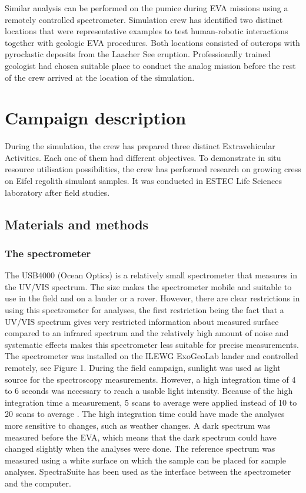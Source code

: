 \documentclass[preprint]{elsarticle}
\begin{document}
Similar analysis can be performed on the pumice during EVA missions using a remotely controlled spectrometer. Simulation crew has identified two distinct locations that were representative examples to test human-robotic interactions together with geologic EVA procedures. Both locations consisted of outcrops with pyroclastic deposits from the Laacher See eruption. Professionally trained geologist had chosen suitable place to conduct the analog mission before the rest of the crew arrived at the location of the simulation.

\section{Campaign description}
During the simulation, the crew has prepared three distinct Extravehicular Activities. Each one of them had different objectives. To demonstrate in situ resource utilisation possibilities, the crew has performed research on growing cress on Eifel regolith simulant samples. It was conducted in ESTEC Life Sciences laboratory after field studies.

\subsection{Materials and methods}

\subsubsection{The spectrometer}
The USB4000 (Ocean Optics) is a relatively small spectrometer that measures in the UV/VIS spectrum. The size makes the spectrometer mobile and suitable to use in the field and on a lander or a rover. However, there are clear restrictions in using this spectrometer for analyses, the first restriction being the fact that a UV/VIS spectrum gives very restricted information about measured surface compared to an infrared spectrum and the relatively high amount of noise and systematic effects makes this spectrometer less suitable for precise measurements. The spectrometer was installed on the ILEWG ExoGeoLab lander and controlled remotely, see Figure 1. During the field campaign, sunlight was used as light source for the spectroscopy measurements. However, a high integration time of 4 to 6 seconds was necessary to reach a usable light intensity. Because of the high integration time a measurement, 5 scans to average were applied instead of 10 to 20 scans to average \cite{ref8}. The high integration time could have made the analyses more sensitive to changes, such as weather changes. A dark spectrum was measured before the EVA, which means that the dark spectrum could have changed slightly when the analyses were done. The reference spectrum was measured using a white surface on which the sample can be placed for sample analyses. SpectraSuite has been used as the interface between the spectrometer and the computer.
\end{document}
